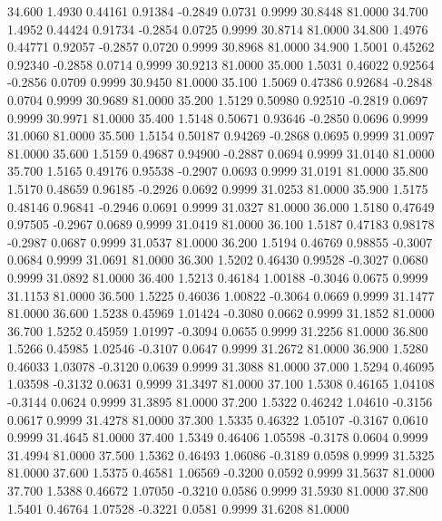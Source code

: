   34.600   1.4930   0.44161   0.91384  -0.2849   0.0731   0.9999  30.8448  81.0000
  34.700   1.4952   0.44424   0.91734  -0.2854   0.0725   0.9999  30.8714  81.0000
  34.800   1.4976   0.44771   0.92057  -0.2857   0.0720   0.9999  30.8968  81.0000
  34.900   1.5001   0.45262   0.92340  -0.2858   0.0714   0.9999  30.9213  81.0000
  35.000   1.5031   0.46022   0.92564  -0.2856   0.0709   0.9999  30.9450  81.0000
  35.100   1.5069   0.47386   0.92684  -0.2848   0.0704   0.9999  30.9689  81.0000
  35.200   1.5129   0.50980   0.92510  -0.2819   0.0697   0.9999  30.9971  81.0000
  35.400   1.5148   0.50671   0.93646  -0.2850   0.0696   0.9999  31.0060  81.0000
  35.500   1.5154   0.50187   0.94269  -0.2868   0.0695   0.9999  31.0097  81.0000
  35.600   1.5159   0.49687   0.94900  -0.2887   0.0694   0.9999  31.0140  81.0000
  35.700   1.5165   0.49176   0.95538  -0.2907   0.0693   0.9999  31.0191  81.0000
  35.800   1.5170   0.48659   0.96185  -0.2926   0.0692   0.9999  31.0253  81.0000
  35.900   1.5175   0.48146   0.96841  -0.2946   0.0691   0.9999  31.0327  81.0000
  36.000   1.5180   0.47649   0.97505  -0.2967   0.0689   0.9999  31.0419  81.0000
  36.100   1.5187   0.47183   0.98178  -0.2987   0.0687   0.9999  31.0537  81.0000
  36.200   1.5194   0.46769   0.98855  -0.3007   0.0684   0.9999  31.0691  81.0000
  36.300   1.5202   0.46430   0.99528  -0.3027   0.0680   0.9999  31.0892  81.0000
  36.400   1.5213   0.46184   1.00188  -0.3046   0.0675   0.9999  31.1153  81.0000
  36.500   1.5225   0.46036   1.00822  -0.3064   0.0669   0.9999  31.1477  81.0000
  36.600   1.5238   0.45969   1.01424  -0.3080   0.0662   0.9999  31.1852  81.0000
  36.700   1.5252   0.45959   1.01997  -0.3094   0.0655   0.9999  31.2256  81.0000
  36.800   1.5266   0.45985   1.02546  -0.3107   0.0647   0.9999  31.2672  81.0000
  36.900   1.5280   0.46033   1.03078  -0.3120   0.0639   0.9999  31.3088  81.0000
  37.000   1.5294   0.46095   1.03598  -0.3132   0.0631   0.9999  31.3497  81.0000
  37.100   1.5308   0.46165   1.04108  -0.3144   0.0624   0.9999  31.3895  81.0000
  37.200   1.5322   0.46242   1.04610  -0.3156   0.0617   0.9999  31.4278  81.0000
  37.300   1.5335   0.46322   1.05107  -0.3167   0.0610   0.9999  31.4645  81.0000
  37.400   1.5349   0.46406   1.05598  -0.3178   0.0604   0.9999  31.4994  81.0000
  37.500   1.5362   0.46493   1.06086  -0.3189   0.0598   0.9999  31.5325  81.0000
  37.600   1.5375   0.46581   1.06569  -0.3200   0.0592   0.9999  31.5637  81.0000
  37.700   1.5388   0.46672   1.07050  -0.3210   0.0586   0.9999  31.5930  81.0000
  37.800   1.5401   0.46764   1.07528  -0.3221   0.0581   0.9999  31.6208  81.0000
